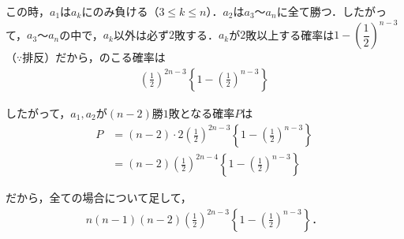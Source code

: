 \documentclass[../main.tex]{subfiles}
\begin{document}
この時，$a_1$は$a_k$にのみ負ける（$3\le k\le n$）．$a_2$は$a_3$〜$a_n$に全て勝つ．したがって，$a_3$〜$a_n$の中で，$a_k$以外は必ず$2$敗する．$a_k$が$2$敗以上する確率は$1-\left(\dfrac12\right)^{n-3}$（$\because$排反）だから，のこる確率は
\begin{align*}
  \left(\frac12\right)^{2n-3}\left\{1-\left(\frac12\right)^{n-3}\right\}
\end{align*}

したがって，$a_1,a_2$が$(n-2)$勝$1$敗となる確率$P$は
\begin{align*}
  P&=(n-2)\cdot2\left(\frac12\right)^{2n-3}\left\{1-\left(\frac12\right)^{n-3}\right\}\\
  &=(n-2)\left(\frac12\right)^{2n-4}\left\{1-\left(\frac12\right)^{n-3}\right\}
\end{align*}

だから，全ての場合について足して，
\begin{align*}
  n(n-1)(n-2)\left(\frac12\right)^{2n-3}\left\{1-\left(\frac12\right)^{n-3}\right\}．
\end{align*}

\newpage
\end{document}
